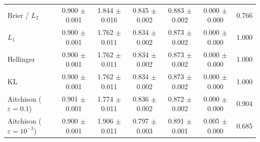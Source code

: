 \begin{tabular}{lcccccc}
Brier / $L_2$ & 0.900 $\pm$ 0.001 & 1.844 $\pm$ 0.016 & 0.845 $\pm$ 0.002 & 0.883 $\pm$ 0.002 & 0.000 $\pm$ 0.000 & 0.766 \\
$L_1$ & 0.900 $\pm$ 0.001 & 1.762 $\pm$ 0.011 & 0.834 $\pm$ 0.002 & 0.873 $\pm$ 0.002 & 0.000 $\pm$ 0.000 & 1.000 \\
Hellinger & 0.900 $\pm$ 0.001 & 1.762 $\pm$ 0.011 & 0.834 $\pm$ 0.002 & 0.873 $\pm$ 0.002 & 0.000 $\pm$ 0.000 & 1.000 \\
KL & 0.900 $\pm$ 0.001 & 1.762 $\pm$ 0.011 & 0.834 $\pm$ 0.002 & 0.873 $\pm$ 0.002 & 0.000 $\pm$ 0.000 & 1.000 \\
Aitchison ($\varepsilon{=}0.1$) & 0.901 $\pm$ 0.001 & 1.774 $\pm$ 0.011 & 0.836 $\pm$ 0.002 & 0.872 $\pm$ 0.002 & 0.000 $\pm$ 0.000 & 0.904 \\
Aitchison ($\varepsilon{=}10^{-3}$) & 0.900 $\pm$ 0.001 & 1.906 $\pm$ 0.011 & 0.797 $\pm$ 0.003 & 0.891 $\pm$ 0.001 & 0.005 $\pm$ 0.000 & 0.685 \\
\bottomrule
\end{tabular}
